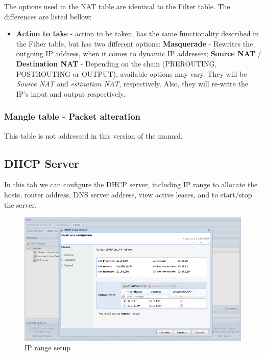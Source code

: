 The options used in the NAT table are identical to the Filter table. The differences are listed bellow:

\begin{itemize}
    \item \textbf{Action to take} - action to be taken, has the same functionality described in the Filter table, but has two different options:
        \subitem \textbf{Masquerade} - Rewrites the outgoing IP address, when it comes to dynamic IP addresses;
        \subitem \textbf{Source NAT} / \textbf{Destination NAT} - Depending on the chain (PREROUTING, POSTROUTING or OUTPUT), available options may vary. They will be \textit{Source NAT} and \textit{estination NAT}, respectively. Also, they will re-write the IP's input and output respectively.
\end{itemize}

\subsubsection{Mangle table - Packet alteration}

This table is not addressed in this version of the manual.

\subsection{DHCP Server}
In this tab we can configure the DHCP server, including IP range to allocate the hosts, router address, DNS server address, view active leases, and to start/stop the server.

\begin{figure}[H]
    \begin{center}
    \includegraphics[scale=0.38]{screenshots/etfw/etfw_dhcp_wizard_01.png}
    \caption{IP range setup}
    \label{fig:etfw_dhcp_wizard_01}
    \end{center}
\end{figure}


